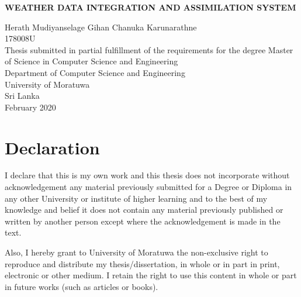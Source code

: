 \documentclass[a4paper,oneside,12pt]{report}
\begin{document}
\begin{titlepage}
    \begin{center}
        \Large{
        \textbf{WEATHER DATA INTEGRATION AND ASSIMILATION SYSTEM}}\\
        \vspace{144pt}
  \large      

        Herath Mudiyanselage Gihan Chanuka Karunarathne\\
        \vspace{24pt}
        178008U\\
         \vspace{72pt}
        \normalsize
        Thesis submitted in partial fulfillment of the requirements for the degree Master of Science in Computer Science and Engineering\\
     
       \vspace{72pt}
        \large
        Department of Computer Science and Engineering\\
        \vspace{24pt}
        University of Moratuwa\\
        Sri Lanka\\
        \vspace{32pt}
        February 2020
        
    \end{center}
\end{titlepage}


\chapter*{Declaration}

I declare that this is my own work and this thesis does not
incorporate without acknowledgement any material previously submitted for a
Degree or Diploma in any other University or institute of higher learning and to
the best of my knowledge and belief it does not contain any material previously
published or written by another person except where the acknowledgement is
made in the text.

Also, I hereby grant to University of Moratuwa the non-exclusive right to
reproduce and distribute my thesis/dissertation, in whole or in part in print,
electronic or other medium. I retain the right to use this content in whole or part
in future works (such as articles or books).
\end{document}
